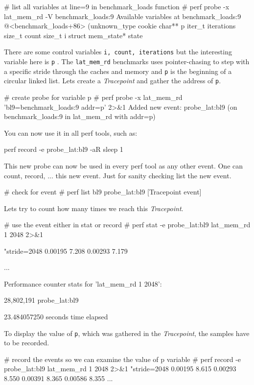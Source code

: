 \starttyping
# list all variables at line=9 in benchmark_loads function
# perf probe -x lat_mem_rd -V benchmark_loads:9
Available variables at benchmark_loads:9
	@<benchmark_loads+86>
		 (unknown_type	cookie
		char**	p
		iter_t	iterations
		size_t	count
		size_t	i
		struct mem_state*	state
\stoptyping

There are some control variables {\tt i, count, iterations} but the interesting
variable here is {\tt p} . The {\tt lat_mem_rd} benchmarks uses pointer-chasing to step
with a specific stride through the caches and memory and {\tt p} is the beginning
of a circular linked list. Lets create a {\em Tracepoint} and gather the
address of {\tt p}.

\starttyping
# create probe for variable p
# perf probe -x lat_mem_rd 'bl9=benchmark_loads:9 addr=p' 2>&1
Added new event:
  probe_lat:bl9        (on benchmark_loads:9 in lat_mem_rd with addr=p)

You can now use it in all perf tools, such as:

	perf record -e probe_lat:bl9 -aR sleep 1

\stoptyping

This new probe can now be used in every perf tool as any other
event. One can count, record, ... this new event. Just for sanity
checking list the new event.

\starttyping
# check for event
# perf list bl9
probe_lat:bl9                                      [Tracepoint event]
\stoptyping

Lets try to count how many times we reach this {\em Tracepoint}.

\starttyping
# use the event either in stat or record
# perf stat -e probe_lat:bl9 lat_mem_rd 1 2048 2>&1

"stride=2048
0.00195 7.208
0.00293 7.179

    ...

 Performance counter stats for 'lat_mem_rd 1 2048':

        28,802,191      probe_lat:bl9

      23.484057250 seconds time elapsed

\stoptyping

To display the value of {\tt p}, which was gathered in the {\em Tracepoint},
the samples have to be recorded.

\starttyping
# record the events so we can examine the value of p variable
# perf record -e probe_lat:bl9 lat_mem_rd 1 2048 2>&1
"stride=2048
0.00195 8.615
0.00293 8.550
0.00391 8.365
0.00586 8.355
     ...


